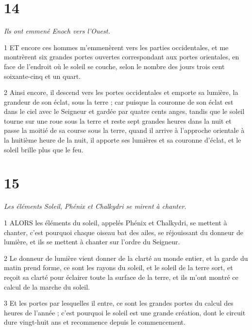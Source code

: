 \chapter{14}

\par \textit{Ils ont emmené Enoch vers l'Ouest.}

\par 1 ET encore ces hommes m'emmenèrent vers les parties occidentales, et me montrèrent six grandes portes ouvertes correspondant aux portes orientales, en face de l'endroit où le soleil se couche, selon le nombre des jours trois cent soixante-cinq et un quart.

\par 2 Ainsi encore, il descend vers les portes occidentales et emporte sa lumière, la grandeur de son éclat, sous la terre ; car puisque la couronne de son éclat est dans le ciel avec le Seigneur et gardée par quatre cents anges, tandis que le soleil tourne sur une roue sous la terre et reste sept grandes heures dans la nuit et passe la moitié de sa course sous la terre, quand il arrive à l'approche orientale à la huitième heure de la nuit, il apporte ses lumières et sa couronne d'éclat, et le soleil brille plus que le feu.

\chapter{15}

\par \textit{Les éléments Soleil, Phénix et Chalkydri se mirent à chanter.}

\par 1 ALORS les éléments du soleil, appelés Phénix et Chalkydri, se mettent à chanter, c'est pourquoi chaque oiseau bat des ailes, se réjouissant du donneur de lumière, et ils se mettent à chanter sur l'ordre du Seigneur.

\par 2 Le donneur de lumière vient donner de la clarté au monde entier, et la garde du matin prend forme, ce sont les rayons du soleil, et le soleil de la terre sort, et reçoit sa clarté pour éclairer toute la surface de la terre, et ils m'ont montré ce calcul de la marche du soleil.

\par 3 Et les portes par lesquelles il entre, ce sont les grandes portes du calcul des heures de l'année ; c'est pourquoi le soleil est une grande création, dont le circuit dure vingt-huit ans et recommence depuis le commencement.

